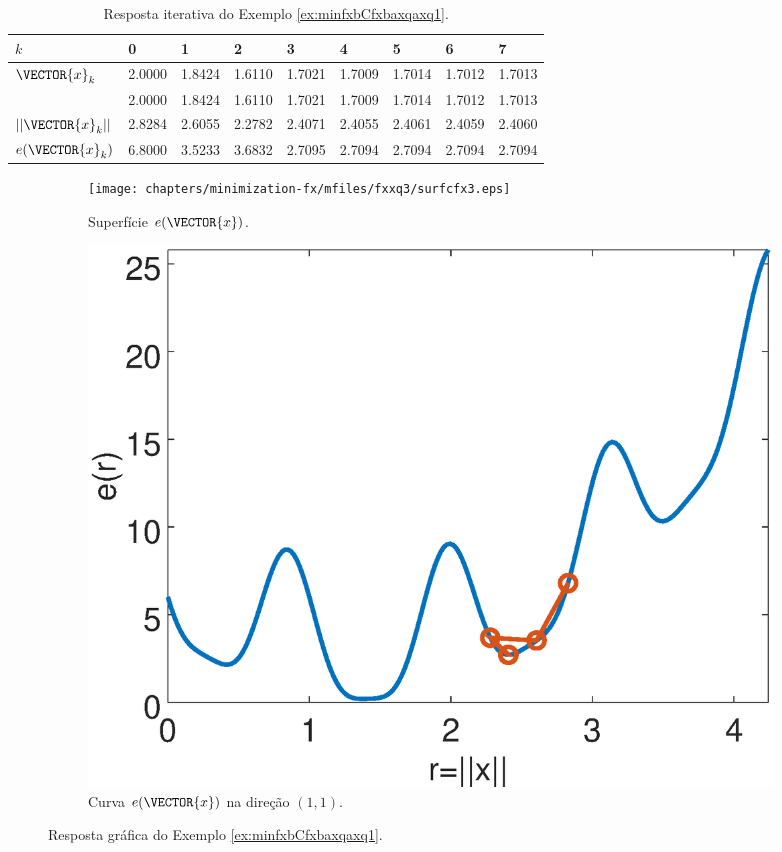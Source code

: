 \begin{table}[h!]
\centering
\begin{tabular}{|l|l|l|l|l|l|l|l|l|}
\hline
$k$ & 0 & 1 & 2 & 3 & 4 & 5 & 6 & 7\\ \hline
$\VECTOR{x}_k$ & 2.0000 & 1.8424 & 1.6110 & 1.7021 & 1.7009 & 1.7014 & 1.7012 & 1.7013 \\ 
~              & 2.0000 & 1.8424 & 1.6110 & 1.7021 & 1.7009 & 1.7014 & 1.7012 & 1.7013 \\ \hline
$||\VECTOR{x}_k||$ & 2.8284 & 2.6055 & 2.2782 & 2.4071 & 2.4055 & 2.4061 & 2.4059 & 2.4060 \\ \hline
$e(\VECTOR{x}_k)$ & 6.8000 & 3.5233 & 3.6832 & 2.7095 & 2.7094 & 2.7094 & 2.7094 & 2.7094 \\ \hline
\end{tabular}
\caption{Resposta iterativa do Exemplo \ref{ex:minfxbCfxbaxqaxq1}.}
\label{table:ex:minfxbCfxbaxqaxq3}
\end{table}
\begin{figure}[h!]
     \centering
     \begin{subfigure}[b]{0.49\textwidth}
         \centering
         \texttt{[image: chapters/minimization-fx/mfiles/fxxq3/surfcfx3.eps]}
         \caption{Superfície $e(\VECTOR{x})$. }
         \label{fig:ex:minfxbCfxbaxqaxq3:a}
     \end{subfigure}
     \hfill
     \begin{subfigure}[b]{0.49\textwidth}
         \centering
         \includegraphics[width=0.98\textwidth]{chapters/minimization-fx/mfiles/fxxq3/plotfx3.eps}
         \caption{Curva $e(\VECTOR{x})$ na direção $(1,1)$.}
         \label{fig:ex:minfxbCfxbaxqaxq3:b}
     \end{subfigure}
        \caption{Resposta gráfica do Exemplo \ref{ex:minfxbCfxbaxqaxq1}. }
        \label{fig:ex:minfxbCfxbaxqaxq3}
\end{figure}

